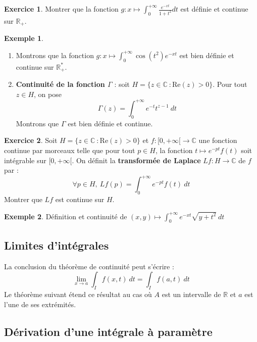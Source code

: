 \documentclass[french]{article}
\newcommand{\R}{\mathbb{R}}
\newcommand{\C}{\mathbb{C}}
\newcommand{\st}{^*}
\theoremstyle{plain}
\theoremstyle{definition}
\newtheorem*{ex}{Exemple}
\newtheorem{exo}{Exercice}
\theoremstyle{remark}
\begin{document}
\begin{exo}
	Montrer que la fonction $g:x\mapsto\displaystyle\int_{0}^{+\infty}\frac{e^{-xt}}{1+t^2}dt$ est définie et continue sur $\R_+$.
\end{exo}

\begin{ex}
	\begin{enumerate}
		\item Montrons que la fonction $g:x\mapsto\displaystyle\int_{0}^{+\infty}\cos(t^2)e^{-xt}$ est bien définie et continue sur $\R_+\st$.
		\item \textbf{Continuité de la fonction $\Gamma$} : soit $H=\{z\in\C\ : \text{Re}(z)>0\}$. Pour tout $z\in H$, on pose $$\Gamma(z)=\int_{0}^{+\infty}e^{-t}t^{z-1}\ dt$$ Montrons que $\Gamma$ est bien définie et continue.
	\end{enumerate}
\end{ex}

\begin{exo}
	Soit $H=\{z\in\C\ : \text{Re}(z)>0\}$ et $f:[0,+\infty[\to\C$ une fonction continue par morceaux telle que pour tout $p\in H$, la fonction $t\mapsto e^{-pt}f(t)$ soit intégrable sur $[0,+\infty[$. On définit la \textbf{transformée de Laplace} $Lf:H\to\C$ de $f$ par : $$\forall p\in H,\ Lf(p)=\int_{0}^{+\infty}e^{-pt}f(t)\ dt$$ Montrer que $Lf$ est continue sur $H$.
\end{exo}

\begin{ex}
	Définition et continuité de $(x,y)\mapsto\displaystyle\int_{0}^{+\infty}e^{-xt}\sqrt{y+t^2}\ dt$
\end{ex}

\subsection{Limites d'intégrales}

La conclusion du théorème de continuité peut s'écrire : $$\underset{x\to a}{\lim}\int_I f(x,t)\ dt=\int_I f(a,t)\ dt$$ Le théorème suivant étend ce résultat au cas où $A$ est un intervalle de $\R$ et $a$ est l'une de ses extrémités.

\subsection{Dérivation d'une intégrale à paramètre}
\end{document}
